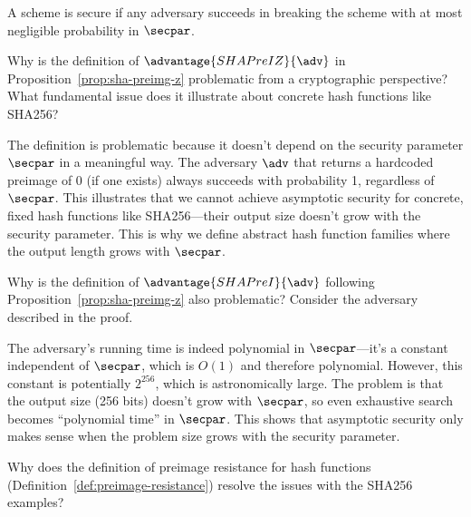 \ifsolutions
\begin{mysolution}
  A scheme is secure if any \ppt adversary succeeds in breaking the scheme with at most negligible probability in $\secpar$.
\end{mysolution}
\fi

\begin{exercise}\label{ex:sha-preimage-problem}
  Why is the definition of $\advantage{SHAPreIZ}{\adv}$ in Proposition~\ref{prop:sha-preimg-z} problematic from a cryptographic perspective?
  What fundamental issue does it illustrate about concrete hash functions like SHA256?
\end{exercise}

\ifsolutions
\begin{mysolution}
  The definition is problematic because it doesn't depend on the security parameter $\secpar$ in a meaningful way.
  The adversary $\adv$ that returns a hardcoded preimage of 0 (if one exists) always succeeds with probability 1, regardless of $\secpar$.
  This illustrates that we cannot achieve asymptotic security for concrete, fixed hash functions like SHA256—their output size doesn't grow with the security parameter.
  This is why we define abstract hash function families where the output length grows with $\secpar$.
\end{mysolution}
\fi

\begin{exercise}\label{ex:sha-random-preimage-problem}
  Why is the definition of $\advantage{SHAPreI}{\adv}$ following Proposition~\ref{prop:sha-preimg-z} also problematic?
  Consider the adversary described in the proof.
\end{exercise}

\ifsolutions
\begin{mysolution}
  The adversary's running time is indeed polynomial in $\secpar$—it's a constant independent of $\secpar$, which is $O(1)$ and therefore polynomial.
  However, this constant is potentially $2^{256}$, which is astronomically large.
  The problem is that the output size (256 bits) doesn't grow with $\secpar$, so even exhaustive search becomes ``polynomial time'' in $\secpar$.
  This shows that asymptotic security only makes sense when the problem size grows with the security parameter.
\end{mysolution}
\fi

\begin{exercise}\label{ex:hash-function-definition}
  Why does the definition of preimage resistance for hash functions (Definition~\ref{def:preimage-resistance}) resolve the issues with the SHA256 examples?
\end{exercise}

